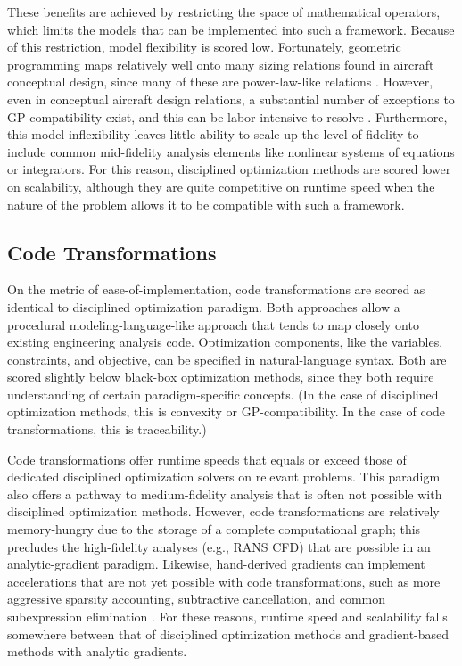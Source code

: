\documentclass[12pt,vi,oneside,table]{report}
\begin{document}
\begin{appendices}
        These benefits are achieved by restricting the space of mathematical operators, which limits the models that can be implemented into such a framework. Because of this restriction, model flexibility is scored low. Fortunately, geometric programming maps relatively well onto many sizing relations found in aircraft conceptual design, since many of these are power-law-like relations \cite{hoburg_geometric_2014}. However, even in conceptual aircraft design relations, a substantial number of exceptions to GP-compatibility exist, and this can be labor-intensive to resolve \cite{tao_phd_thesis}. Furthermore, this model inflexibility leaves little ability to scale up the level of fidelity to include common mid-fidelity analysis elements like nonlinear systems of equations or integrators. For this reason, disciplined optimization methods are scored lower on scalability, although they are quite competitive on runtime speed when the nature of the problem allows it to be compatible with such a framework.

        \subsection*{Code Transformations}

        On the metric of ease-of-implementation, code transformations are scored as identical to disciplined optimization paradigm. Both approaches allow a procedural modeling-language-like approach that tends to map closely onto existing engineering analysis code. Optimization components, like the variables, constraints, and objective, can be specified in natural-language syntax. Both are scored slightly below black-box optimization methods, since they both require understanding of certain paradigm-specific concepts. (In the case of disciplined optimization methods, this is convexity or GP-compatibility. In the case of code transformations, this is traceability.)

        Code transformations offer runtime speeds that equals or exceed those of dedicated disciplined optimization solvers on relevant problems. This paradigm also offers a pathway to medium-fidelity analysis that is often not possible with disciplined optimization methods. However, code transformations are relatively memory-hungry due to the storage of a complete computational graph; this precludes the high-fidelity analyses (e.g., RANS CFD) that are possible in an analytic-gradient paradigm. Likewise, hand-derived gradients can implement accelerations that are not yet possible with code transformations, such as more aggressive sparsity accounting, subtractive cancellation, and common subexpression elimination \cite{casadi, martins_complexstep_2003, martins_engineering_2021}. For these reasons, runtime speed and scalability falls somewhere between that of disciplined optimization methods and gradient-based methods with analytic gradients.


\end{appendices}
\end{document}
